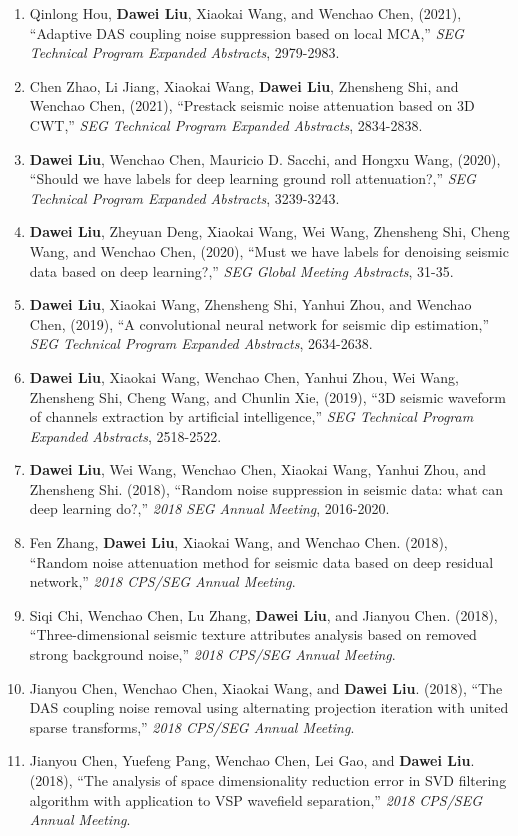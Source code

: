 \documentclass[11pt,a4paper]{article}
\begin{document}
\begin{enumerate}[leftmargin=1.5em, itemsep=0pt, topsep=2pt]
    \item Qinlong Hou, \textbf{Dawei Liu}, Xiaokai Wang, and Wenchao Chen, (2021), ``Adaptive DAS coupling noise suppression based on local MCA,'' {\em SEG Technical Program Expanded Abstracts}, 2979-2983.
    \item Chen Zhao, Li Jiang, Xiaokai Wang, \textbf{Dawei Liu}, Zhensheng Shi, and Wenchao Chen, (2021), ``Prestack seismic noise attenuation based on 3D CWT,'' {\em SEG Technical Program Expanded Abstracts}, 2834-2838.
    \item \textbf{Dawei Liu}, Wenchao Chen, Mauricio D. Sacchi, and Hongxu Wang, (2020), ``Should we have labels for deep learning ground roll attenuation?,'' {\em SEG Technical Program Expanded Abstracts}, 3239-3243.
    \item \textbf{Dawei Liu}, Zheyuan Deng, Xiaokai Wang, Wei Wang, Zhensheng Shi, Cheng Wang, and Wenchao Chen, (2020), ``Must we have labels for denoising seismic data based on deep learning?,'' {\em SEG Global Meeting Abstracts}, 31-35.
    \item \textbf{Dawei Liu}, Xiaokai Wang, Zhensheng Shi, Yanhui Zhou, and Wenchao Chen, (2019), ``A convolutional neural network for seismic dip estimation,'' {\em SEG Technical Program Expanded Abstracts}, 2634-2638.
    \item \textbf{Dawei Liu}, Xiaokai Wang, Wenchao Chen, Yanhui Zhou, Wei Wang, Zhensheng Shi, Cheng Wang, and Chunlin Xie, (2019), ``3D seismic waveform of channels extraction by artificial intelligence,'' {\em SEG Technical Program Expanded Abstracts}, 2518-2522.
    \item \textbf{Dawei Liu}, Wei Wang, Wenchao Chen, Xiaokai Wang, Yanhui Zhou, and Zhensheng Shi. (2018), ``Random noise suppression in seismic data: what can deep learning do?,'' {\em 2018 SEG Annual Meeting}, 2016-2020.
    \item Fen Zhang, \textbf{Dawei Liu}, Xiaokai Wang, and Wenchao Chen. (2018), ``Random noise attenuation method for seismic data based on deep residual network,'' {\em 2018 CPS/SEG Annual Meeting}.
    \item Siqi Chi, Wenchao Chen, Lu Zhang, \textbf{Dawei Liu}, and Jianyou Chen. (2018), ``Three-dimensional seismic texture attributes analysis based on removed strong background noise,'' {\em 2018 CPS/SEG Annual Meeting}.
    \item Jianyou Chen, Wenchao Chen, Xiaokai Wang, and \textbf{Dawei Liu}. (2018), ``The DAS coupling noise removal using alternating projection iteration with united sparse transforms,'' {\em 2018 CPS/SEG Annual Meeting}.
    \item Jianyou Chen, Yuefeng Pang, Wenchao Chen, Lei Gao, and \textbf{Dawei Liu}. (2018), ``The analysis of space dimensionality reduction error in SVD filtering algorithm with application to VSP wavefield separation,'' {\em 2018 CPS/SEG Annual Meeting}.
\end{enumerate}
\end{document}
